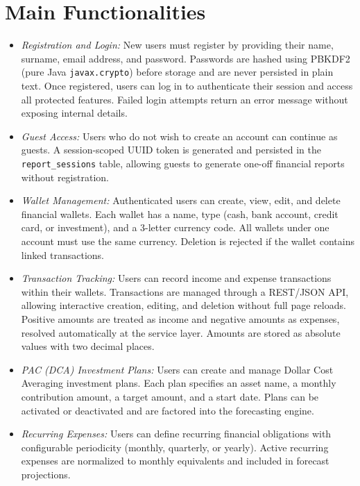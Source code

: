 \section{Main Functionalities}

\begin{itemize}

    \item \textit{Registration and Login:} New users must register by providing their name, surname, email address, and password. Passwords are hashed using PBKDF2 (pure Java \texttt{javax.crypto}) before storage and are never persisted in plain text. Once registered, users can log in to authenticate their session and access all protected features. Failed login attempts return an error message without exposing internal details.

    \item \textit{Guest Access:} Users who do not wish to create an account can continue as guests. A session-scoped UUID token is generated and persisted in the \texttt{report\_sessions} table, allowing guests to generate one-off financial reports without registration.

    \item \textit{Wallet Management:} Authenticated users can create, view, edit, and delete financial wallets. Each wallet has a name, type (cash, bank account, credit card, or investment), and a 3-letter currency code. All wallets under one account must use the same currency. Deletion is rejected if the wallet contains linked transactions.

    \item \textit{Transaction Tracking:} Users can record income and expense transactions within their wallets. Transactions are managed through a REST/JSON API, allowing interactive creation, editing, and deletion without full page reloads. Positive amounts are treated as income and negative amounts as expenses, resolved automatically at the service layer. Amounts are stored as absolute values with two decimal places.

    \item \textit{PAC (DCA) Investment Plans:} Users can create and manage Dollar Cost Averaging investment plans. Each plan specifies an asset name, a monthly contribution amount, a target amount, and a start date. Plans can be activated or deactivated and are factored into the forecasting engine.

    \item \textit{Recurring Expenses:} Users can define recurring financial obligations with configurable periodicity (monthly, quarterly, or yearly). Active recurring expenses are normalized to monthly equivalents and included in forecast projections.


\end{itemize}
